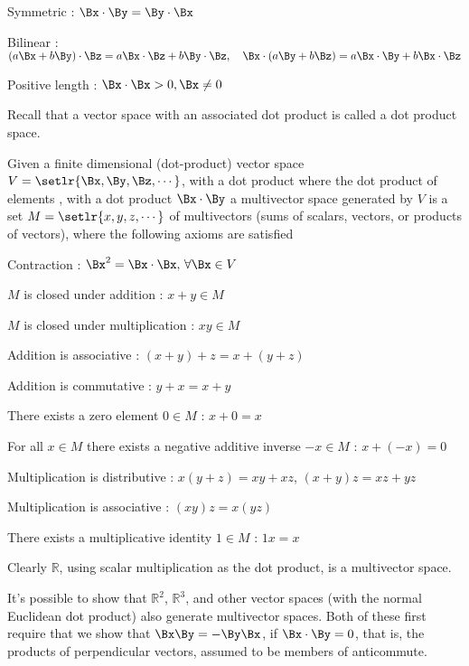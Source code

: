 Symmetric : \( \Bx \cdot \By = \By \cdot \Bx \)

Bilinear : \( (a \Bx + b \By) \cdot \Bz = a \Bx \cdot \Bz + b \By \cdot \Bz,\quad \Bx \cdot (a \By + b \Bz) = a \Bx \cdot \By + b \Bx \cdot \Bz \)

Positive length : \( \Bx \cdot \Bx > 0, \Bx \ne 0 \)


Recall that a vector space with an associated dot product is called a dot product space.

Given a finite dimensional (dot-product) vector space \( V = \setlr{ \Bx, \By, \Bz, \cdots } \), with a dot product where the dot product of elements
, with a dot product \( \Bx \cdot \By \)
a multivector space generated by \( V \) is a set \( M = \setlr{ x, y, z, \cdots } \) of multivectors (sums of scalars, vectors, or products of vectors), where the following axioms are satisfied

Contraction : \( \Bx^2 = \Bx \cdot \Bx, \,\forall \Bx \in V \)

\( M \) is closed under addition : \( x + y \in M \)

\( M \) is closed under multiplication : \( x y \in M \)

Addition is associative : \( (x + y) + z = x + (y + z) \)

Addition is commutative : \( y + x = x + y \)

There exists a zero element \( 0 \in M \)  : \( x + 0 = x \)

For all \( x \in M \) there exists a negative additive inverse \( -x \in M \) : \( x + (-x) = 0 \)

Multiplication is distributive  : \( x( y + z ) = x y + x z \), \( (x + y)z = x z + y z \)

Multiplication is associative : \( (x y) z = x ( y z ) \)

There exists a multiplicative identity \( 1 \in M \) : \( 1 x = x \)

Clearly $\mathbb{R}$, using scalar multiplication as the dot product, is a multivector space.

It's possible to show that $\mathbb{R}^2$, $\mathbb{R}^3$, and other vector spaces (with the normal Euclidean dot product) also generate multivector spaces.  Both of these first require that we show that \( \Bx \By = - \By \Bx \), if \( \Bx \cdot \By = 0 \), that is, the products of perpendicular vectors, assumed to be members of  anticommute.

